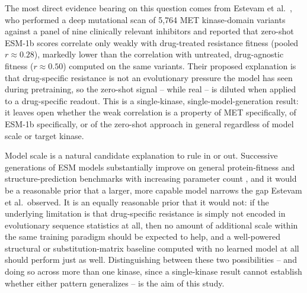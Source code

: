 \documentclass[pdflatex,sn-mathphys-num]{sn-jnl}%
\theoremstyle{thmstyleone}%
\theoremstyle{thmstyletwo}%
\theoremstyle{thmstylethree}%
\begin{document}
The most direct evidence bearing on this question comes from Estevam et al.\ \citep{Estevam2025}, who performed a deep mutational scan of 5{,}764 MET kinase-domain variants against a panel of nine clinically relevant inhibitors and reported that zero-shot ESM-1b scores correlate only weakly with drug-treated resistance fitness (pooled $r \approx 0.28$), markedly lower than the correlation with untreated, drug-agnostic fitness ($r \approx 0.50$) computed on the same variants. Their proposed explanation is that drug-specific resistance is not an evolutionary pressure the model has seen during pretraining, so the zero-shot signal -- while real -- is diluted when applied to a drug-specific readout. This is a single-kinase, single-model-generation result: it leaves open whether the weak correlation is a property of MET specifically, of ESM-1b specifically, or of the zero-shot approach in general regardless of model scale or target kinase.

Model scale is a natural candidate explanation to rule in or out. Successive generations of ESM models substantially improve on general protein-fitness and structure-prediction benchmarks with increasing parameter count \citep{Lin2023}, and it would be a reasonable prior that a larger, more capable model narrows the gap Estevam et al.\ observed. It is an equally reasonable prior that it would not: if the underlying limitation is that drug-specific resistance is simply not encoded in evolutionary sequence statistics at all, then no amount of additional scale within the same training paradigm should be expected to help, and a well-powered structural or substitution-matrix baseline computed with no learned model at all should perform just as well. Distinguishing between these two possibilities -- and doing so across more than one kinase, since a single-kinase result cannot establish whether either pattern generalizes -- is the aim of this study.
\end{document}
